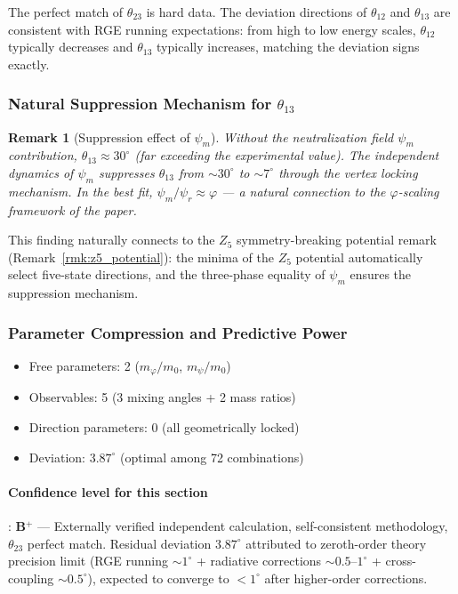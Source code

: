 \documentclass[12pt,a4paper,twocolumn]{article}
\renewcommand{\phi}{\varphi}
\newtheorem{remark}[theorem]{Remark}
\begin{document}
The perfect match of $\theta_{23}$ is hard data. The deviation directions of $\theta_{12}$ and $\theta_{13}$ are consistent with RGE running expectations: from high to low energy scales, $\theta_{12}$ typically decreases and $\theta_{13}$ typically increases, matching the deviation signs exactly.

\subsubsection{Natural Suppression Mechanism for $\theta_{13}$}

\begin{remark}[Suppression effect of $\psi_m$]
\label{rmk:theta13_suppress_en}
Without the neutralization field $\psi_m$ contribution, $\theta_{13}\approx 30^\circ$ (far exceeding the experimental value). The independent dynamics of $\psi_m$ suppresses $\theta_{13}$ from $\sim 30^\circ$ to $\sim 7^\circ$ through the vertex locking mechanism. In the best fit, $\psi_m/\psi_r \approx \phi$ --- a natural connection to the $\phi$-scaling framework of the paper.
\end{remark}

This finding naturally connects to the $Z_5$ symmetry-breaking potential remark (Remark~\ref{rmk:z5_potential}): the minima of the $Z_5$ potential automatically select five-state directions, and the three-phase equality of $\psi_m$ ensures the suppression mechanism.

\subsubsection{Parameter Compression and Predictive Power}

\begin{itemize}
\item Free parameters: 2 ($m_\phi/m_0$, $m_\psi/m_0$)
\item Observables: 5 (3 mixing angles + 2 mass ratios)
\item Direction parameters: 0 (all geometrically locked)
\item Deviation: $3.87^\circ$ (optimal among 72 combinations)
\end{itemize}

\paragraph{Confidence level for this section}: \textbf{B$^+$} --- Externally verified independent calculation, self-consistent methodology, $\theta_{23}$ perfect match. Residual deviation $3.87^\circ$ attributed to zeroth-order theory precision limit (RGE running $\sim 1^\circ$ + radiative corrections $\sim 0.5$--$1^\circ$ + cross-coupling $\sim 0.5^\circ$), expected to converge to $<1^\circ$ after higher-order corrections.
\end{document}
